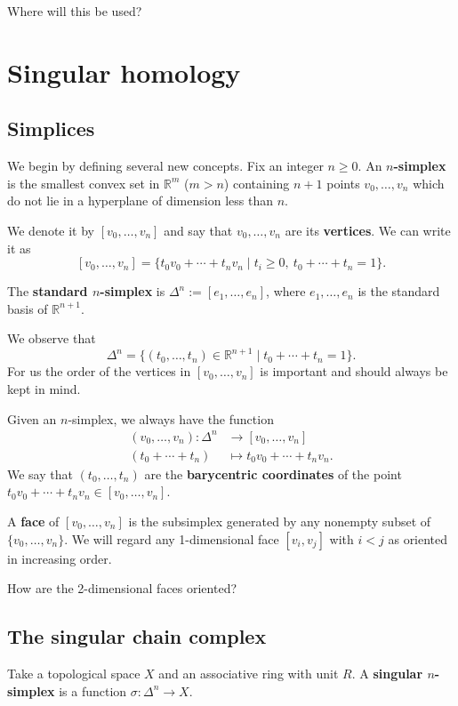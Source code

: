 \documentclass{book}
\theoremstyle{definition}
\newcommand{\R}{\mathbb{R}}
\begin{document}
Where will this be used?

\chapter{Singular homology}

\section{Simplices}

We begin by defining several new concepts. Fix an integer
$n\geq0$. An \textbf{$n$-simplex} is the smallest convex set
in $\R^m$ ($m>n$) containing $n+1$ points
$v_0,\ldots,v_n$ which do not lie in a hyperplane of
dimension less than $n$.


We denote it by $[v_0,\ldots,v_n]$ and say that
$v_0,\ldots,v_n$ are its \textbf{vertices}. We can write it
as
$$
[v_0,\ldots,v_n]
=
\{t_0v_0+\cdots+t_nv_n
\mid t_i\geq0,\ t_0+\cdots+t_n=1\}.
$$

The \textbf{standard $n$-simplex} is
$\Delta^n:=[e_1,\ldots,e_n]$, where $e_1,\ldots,e_n$ is the
standard basis of $\R^{n+1}$.

We observe that
$$
\Delta^n=
\{(t_0,\ldots,t_n)\in\R^{n+1}
\mid t_0+\cdots+t_n=1\}.
$$
For us the order of the vertices in $[v_0,\ldots,v_n]$ is
important and should always be kept in mind.

Given an $n$-simplex, we always have the function
$$
\begin{aligned}
(v_0,\ldots,v_n):\Delta^n&\to[v_0,\ldots,v_n]\\
(t_0+\cdots+t_n)&\mapsto t_0v_0+\cdots+t_nv_n.
\end{aligned}
$$
We say that $(t_0,\ldots,t_n)$ are the
\textbf{barycentric coordinates} of the point
$t_0v_0+\cdots+t_nv_n\in[v_0,\ldots,v_n]$.

A \textbf{face} of $[v_0,\ldots,v_n]$ is the subsimplex
generated by any nonempty subset of $\{v_0,\ldots,v_n\}$. We
will regard any 1-dimensional face $[v_i,v_j]$ with $i<j$ as
oriented in increasing order.

How are the 2-dimensional faces oriented?

\section{The singular chain complex}

Take a topological space $X$ and an associative ring with
unit $R$. A \textbf{singular $n$-simplex} is a function
$\sigma:\Delta^n\to X$.
\end{document}
